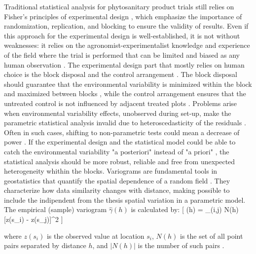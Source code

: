 \documentclass[12pt,a4paper,oneside]{report}
\begin{document}
Traditional statistical analysis for phytosanitary product trials still relies on 
Fisher's principles of experimental design 
\cite{fisherStatisticalMethodsResearch1992, mead_statistical_2012, casler_randomization_2015}, 
which emphasize the importance of randomization, replication, and blocking to 
ensure the validity of results. Even if this approach for the experimental design 
is well-established, it is not without weaknesses: it relies on the 
agronomist-experimentalist knowledge and experience of the field where the trial 
is performed that can be limited and biased as any human observation 
\cite{petersen_assessment_2014, bouwman_designing_2020}. The experimental design part 
that mostly relies on human choice is the block disposal and the control 
arrangement \cite{piepho_optimal_2015, van_es_guidelines_2007}. The block disposal 
should guarantee that the environmental variability is minimized within the block 
and maximized between blocks \cite{brien_designs_2011, van_es_spatial_2005}, while 
the control arrangement ensures that the untreated control is not influenced by 
adjacent treated plots \cite{paciorek_practical_2009, piepho_experimental_2013}. 
Problems arise when environmental variability effects, unobserved during set-up, 
make the parametric statistical analysis invalid due to heteroscedasticity of the 
residuals \cite{schabenberger_contemporary_2017, onofri_analysis_2010}. Often in such cases, 
shifting to non-parametric tests could mean a decrease 
of power \cite{stroup_rethinking_2014, littell_sas_2006}.
If the experimental design and the statistical model could be able to catch 
the environmental variability "a posteriori" instead of "a priori"
\cite{oliver_geostatistics_2010, webster_geostatistics_2007}, 
the statistical analysis should be more robust, reliable and free from
unexpected heterogeneity whithin the blocks.
Variograms are fundamental tools in geostatistics that quantify 
the spatial dependence of a random field 
\cite{cressie_statistics_1993, goovaerts_geostatistics_1997}. 
They characterize how data similarity 
changes with distance, making possible to include the indipendent from the thesis
spatial variation in a parametric model. 
The empirical (sample) variogram $\hat{\gamma}(h)$ is calculated by:
[ \hat{\gamma}(h) =  \sum_{(i,j) \in N(h)} [z(s_i) - z(s_j)]^2 ]

where $z(s_i)$ is the observed value at location $s_i$, $N(h)$ is the set of all 
point pairs separated by distance $h$, and $|N(h)|$ is the number of such pairs
\cite{matheron_principles_1963, journel_mining_1978}.
\end{document}
